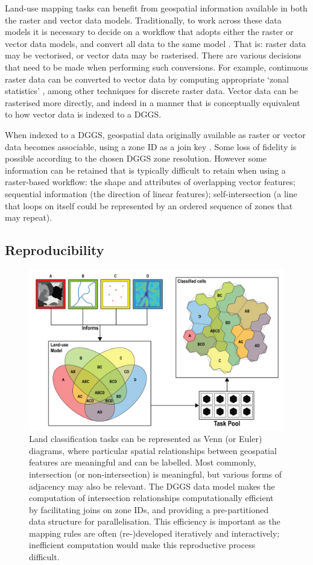 \documentclass[]{interact}
\theoremstyle{plain}%
\theoremstyle{definition}
\theoremstyle{remark}
\begin{document}
Land-use mapping tasks can benefit from geospatial information available in both the raster and vector data models. Traditionally, to work across these data models it is necessary to decide on a workflow that adopts either the raster or vector data models, and convert all data to the same model \citep{winter1998bridging,wade2003comparison}. That is: raster data may be vectorised, or vector data may be rasterised. There are various decisions that need to be made when performing such conversions. For example, continuous raster data can be converted to vector data by computing appropriate `zonal statistics' \citep{zhang2015efficient,singla2018distributed}, among other techniques for discrete raster data. Vector data can be rasterised more directly, and indeed in a manner that is conceptually equivalent to how vector data is indexed to a \ac{DGGS}.

When indexed to a \ac{DGGS}, geospatial data originally available as raster or vector data becomes associable, using a zone ID as a join key \citep{dutton1989modelling,sahr2019central}. Some loss of fidelity is possible according to the chosen \ac{DGGS} zone resolution. However some information can be retained that is typically difficult to retain when using a raster-based workflow: the shape and attributes of overlapping vector features; sequential information (the direction of linear features); self-intersection (a line that loops on itself could be represented by an ordered sequence of zones that may repeat).   

\subsection{Reproducibility}

\begin{figure}[t]
    \centering
    \includegraphics[width=0.65\linewidth]{images/DGGS_lu-03.png}
    \caption{Land classification tasks can be represented as Venn (or Euler) diagrams, where particular spatial relationships between geospatial features are meaningful and can be labelled. Most commonly, intersection (or non-intersection) is meaningful, but various forms of adjacency may also be relevant. The \ac{DGGS} data model makes the computation of intersection relationships computationally efficient by facilitating joins on zone IDs, and providing a pre-partitioned data structure for parallelisation. This efficiency is important as the mapping rules are often (re-)developed iteratively and interactively; inefficient computation would make this reproductive process difficult.}
    \label{fig:Reproducible}
\end{figure}
\end{document}
